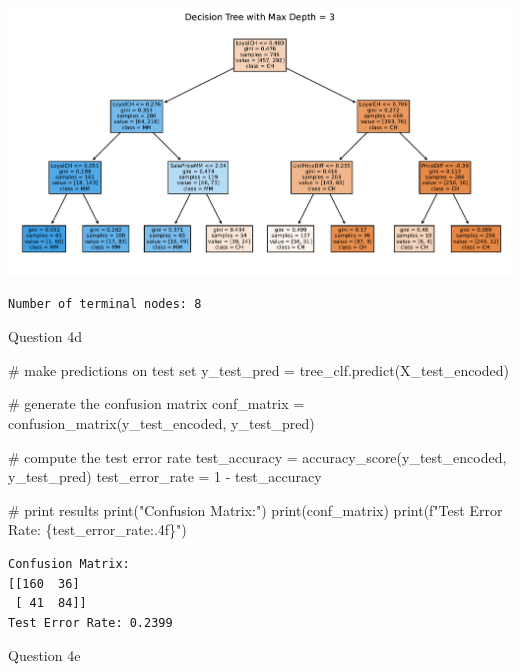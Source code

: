 \documentclass[
  letterpaper,
  DIV=11,
  numbers=noendperiod]{scrartcl}
\newenvironment{Shaded}{\begin{snugshade}}{\end{snugshade}}
\newcommand{\BuiltInTok}[1]{\textcolor[rgb]{0.00,0.23,0.31}{#1}}
\newcommand{\CommentTok}[1]{\textcolor[rgb]{0.37,0.37,0.37}{#1}}
\newcommand{\DecValTok}[1]{\textcolor[rgb]{0.68,0.00,0.00}{#1}}
\newcommand{\NormalTok}[1]{\textcolor[rgb]{0.00,0.23,0.31}{#1}}
\newcommand{\OperatorTok}[1]{\textcolor[rgb]{0.37,0.37,0.37}{#1}}
\newcommand{\SpecialCharTok}[1]{\textcolor[rgb]{0.37,0.37,0.37}{#1}}
\newcommand{\SpecialStringTok}[1]{\textcolor[rgb]{0.13,0.47,0.30}{#1}}
\newcommand{\StringTok}[1]{\textcolor[rgb]{0.13,0.47,0.30}{#1}}
\begin{document}
\includegraphics{Untitled-1_files/figure-pdf/cell-11-output-2.pdf}

\begin{verbatim}
Number of terminal nodes: 8
\end{verbatim}

Question 4d

\begin{Shaded}
\begin{Highlighting}[]
\CommentTok{\# make predictions on test set}
\NormalTok{y\_test\_pred }\OperatorTok{=}\NormalTok{ tree\_clf.predict(X\_test\_encoded)}

\CommentTok{\# generate the confusion matrix}
\NormalTok{conf\_matrix }\OperatorTok{=}\NormalTok{ confusion\_matrix(y\_test\_encoded, y\_test\_pred)}

\CommentTok{\# compute the test error rate}
\NormalTok{test\_accuracy }\OperatorTok{=}\NormalTok{ accuracy\_score(y\_test\_encoded, y\_test\_pred)}
\NormalTok{test\_error\_rate }\OperatorTok{=} \DecValTok{1} \OperatorTok{{-}}\NormalTok{ test\_accuracy}

\CommentTok{\# print results}
\BuiltInTok{print}\NormalTok{(}\StringTok{"Confusion Matrix:"}\NormalTok{)}
\BuiltInTok{print}\NormalTok{(conf\_matrix)}
\BuiltInTok{print}\NormalTok{(}\SpecialStringTok{f"Test Error Rate: }\SpecialCharTok{\{}\NormalTok{test\_error\_rate}\SpecialCharTok{:.4f\}}\SpecialStringTok{"}\NormalTok{)}
\end{Highlighting}
\end{Shaded}

\begin{verbatim}
Confusion Matrix:
[[160  36]
 [ 41  84]]
Test Error Rate: 0.2399
\end{verbatim}

Question 4e
\end{document}
